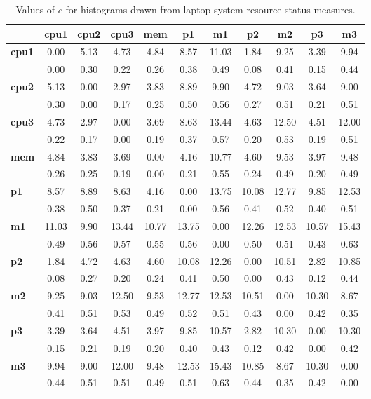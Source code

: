 \begin{table}[h!]
\scriptsize
\begin{center}
\begin{tabular}{| l | c | c | c || c || c | c || c | c || c | c |}\hline
 & {\bf cpu1} & {\bf cpu2} & {\bf cpu3} & {\bf mem} & {\bf p1} & {\bf m1} & {\bf p2} & {\bf m2} & {\bf p3} & {\bf m3} \\\hline
{\bf cpu1} & 0.00 & 5.13 & 4.73 & 4.84 & 8.57 & 11.03 & 1.84 & 9.25 & 3.39 & 9.94 \\
 & 0.00  & 0.30  & 0.22  & 0.26  & 0.38  & 0.49  & 0.08  & 0.41  & 0.15  & 0.44 \\\hline
{\bf cpu2} & 5.13 & 0.00 & 2.97 & 3.83 & 8.89 & 9.90 & 4.72 & 9.03 & 3.64 & 9.00 \\
 & 0.30  & 0.00  & 0.17  & 0.25  & 0.50  & 0.56  & 0.27  & 0.51  & 0.21  & 0.51 \\\hline
{\bf cpu3} & 4.73 & 2.97 & 0.00 & 3.69 & 8.63 & 13.44 & 4.63 & 12.50 & 4.51 & 12.00 \\
 & 0.22  & 0.17  & 0.00  & 0.19  & 0.37  & 0.57  & 0.20  & 0.53  & 0.19  & 0.51 \\\hline\hline
{\bf mem} & 4.84 & 3.83 & 3.69 & 0.00 & 4.16 & 10.77 & 4.60 & 9.53 & 3.97 & 9.48 \\
 & 0.26  & 0.25  & 0.19  & 0.00  & 0.21  & 0.55  & 0.24  & 0.49  & 0.20  & 0.49 \\\hline\hline
{\bf p1} & 8.57 & 8.89 & 8.63 & 4.16 & 0.00 & 13.75 & 10.08 & 12.77 & 9.85 & 12.53 \\
 & 0.38  & 0.50  & 0.37  & 0.21  & 0.00  & 0.56  & 0.41  & 0.52  & 0.40  & 0.51 \\\hline
{\bf m1} & 11.03 & 9.90 & 13.44 & 10.77 & 13.75 & 0.00 & 12.26 & 12.53 & 10.57 & 15.43 \\
 & 0.49  & 0.56  & 0.57  & 0.55  & 0.56  & 0.00  & 0.50  & 0.51  & 0.43  & 0.63 \\\hline\hline
{\bf p2} & 1.84 & 4.72 & 4.63 & 4.60 & 10.08 & 12.26 & 0.00 & 10.51 & 2.82 & 10.85 \\
 & 0.08  & 0.27  & 0.20  & 0.24  & 0.41  & 0.50  & 0.00  & 0.43  & 0.12  & 0.44 \\\hline
{\bf m2} & 9.25 & 9.03 & 12.50 & 9.53 & 12.77 & 12.53 & 10.51 & 0.00 & 10.30 & 8.67 \\
 & 0.41  & 0.51  & 0.53  & 0.49  & 0.52  & 0.51  & 0.43  & 0.00  & 0.42  & 0.35 \\\hline\hline
{\bf p3} & 3.39 & 3.64 & 4.51 & 3.97 & 9.85 & 10.57 & 2.82 & 10.30 & 0.00 & 10.30 \\
 & 0.15  & 0.21  & 0.19  & 0.20  & 0.40  & 0.43  & 0.12  & 0.42  & 0.00  & 0.42 \\\hline
{\bf m3} & 9.94 & 9.00 & 12.00 & 9.48 & 12.53 & 15.43 & 10.85 & 8.67 & 10.30 & 0.00 \\
 & 0.44  & 0.51  & 0.51  & 0.49  & 0.51  & 0.63  & 0.44  & 0.35  & 0.42  & 0.00 \\\hline
\end{tabular}
\caption{Values of $c$ for histograms drawn from laptop system resource status measures.}
\end{center}
\end{table}